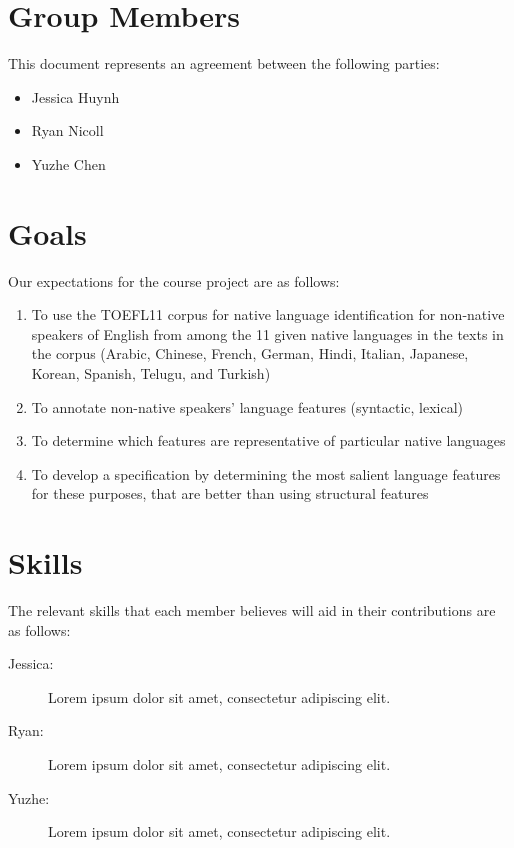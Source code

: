 \documentclass{article}
\newcommand{\groupmember}[1]{#1}
\begin{document}
\section{Group Members} %
\label{par:group_members}
This document represents an agreement between the following parties:
\begin{itemize}
    \item \groupmember{Jessica Huynh}
    \item \groupmember{Ryan Nicoll}
    \item \groupmember{Yuzhe Chen}
\end{itemize}

\section{Goals} %
\label{par:expectations}
Our expectations for the course project are as follows:
\begin{enumerate}
    \item To use the TOEFL11 corpus for native language identification for non-native speakers of English from among the 11 given native languages in the texts in the corpus (Arabic, Chinese, French, German, Hindi, Italian, Japanese, Korean, Spanish, Telugu, and Turkish)
    \item To annotate non-native speakers' language features (syntactic, lexical)
    \item To determine which features are representative of particular native languages
    \item To develop a specification by determining the most salient language features for these purposes, that are better than using structural features
\end{enumerate}

\section{Skills} %
\label{sec:skills}

The relevant skills that each member believes will aid in their contributions are as follows:

\begin{description}
    \item[\groupmember{Jessica}:] Lorem ipsum dolor sit amet, consectetur adipiscing elit.
    \item[\groupmember{Ryan}:] Lorem ipsum dolor sit amet, consectetur adipiscing elit.
    \item[\groupmember{Yuzhe}:] Lorem ipsum dolor sit amet, consectetur adipiscing elit.
\end{description}
\end{document}

